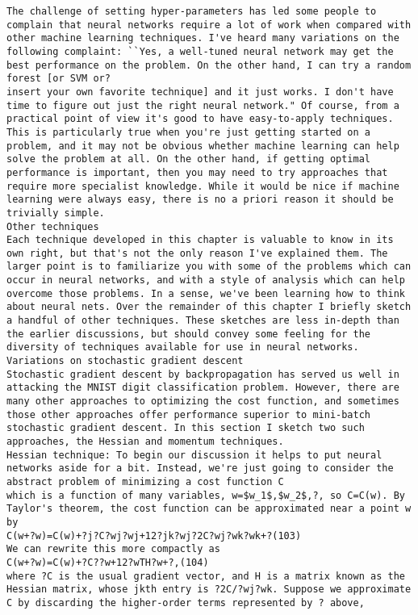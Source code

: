 \begin{lstlisting}
The challenge of setting hyper-parameters has led some people to complain that neural networks require a lot of work when compared with other machine learning techniques. I've heard many variations on the following complaint: ``Yes, a well-tuned neural network may get the best performance on the problem. On the other hand, I can try a random forest [or SVM or?
insert your own favorite technique] and it just works. I don't have time to figure out just the right neural network." Of course, from a practical point of view it's good to have easy-to-apply techniques. This is particularly true when you're just getting started on a problem, and it may not be obvious whether machine learning can help solve the problem at all. On the other hand, if getting optimal performance is important, then you may need to try approaches that require more specialist knowledge. While it would be nice if machine learning were always easy, there is no a priori reason it should be trivially simple.
Other techniques
Each technique developed in this chapter is valuable to know in its own right, but that's not the only reason I've explained them. The larger point is to familiarize you with some of the problems which can occur in neural networks, and with a style of analysis which can help overcome those problems. In a sense, we've been learning how to think about neural nets. Over the remainder of this chapter I briefly sketch a handful of other techniques. These sketches are less in-depth than the earlier discussions, but should convey some feeling for the diversity of techniques available for use in neural networks.
Variations on stochastic gradient descent
Stochastic gradient descent by backpropagation has served us well in attacking the MNIST digit classification problem. However, there are many other approaches to optimizing the cost function, and sometimes those other approaches offer performance superior to mini-batch stochastic gradient descent. In this section I sketch two such approaches, the Hessian and momentum techniques.
Hessian technique: To begin our discussion it helps to put neural networks aside for a bit. Instead, we're just going to consider the abstract problem of minimizing a cost function C
which is a function of many variables, w=$w_1$,$w_2$,?, so C=C(w). By Taylor's theorem, the cost function can be approximated near a point w by 
C(w+?w)=C(w)+?j?C?wj?wj+12?jk?wj?2C?wj?wk?wk+?(103)
We can rewrite this more compactly as 
C(w+?w)=C(w)+?C??w+12?wTH?w+?,(104)
where ?C is the usual gradient vector, and H is a matrix known as the Hessian matrix, whose jkth entry is ?2C/?wj?wk. Suppose we approximate C by discarding the higher-order terms represented by ? above, 

\end{lstlisting}
